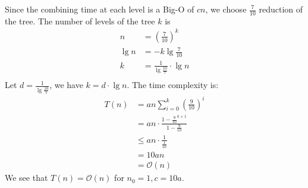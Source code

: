 \begin{parts}
\begin{customsolutionbox}
                    Since the combining time at each level is a Big-O of $cn$, we choose $\frac{7}{10}$ reduction of the tree. The number of levels of the tree $k$ is 
                    \begin{align*}
                        n &= \left(\frac{7}{10}\right)^k \\
                        \lg n &= -k \lg \frac{7}{10} \\ 
                        k &= \frac{1}{\lg \frac{10}{7}} \cdot \lg n \\
                    \end{align*}
                    Let $d = \frac{1}{\lg \frac{10}{7}}$, we have $k = d \cdot \lg n$. The time complexity is:
                    \begin{align}
                        T(n) &= an \sum_{i=0}^{k} \left(\frac{9}{10}\right)^i \\ 
                        &= an \cdot \frac{1-\frac{9}{10}^{k+1}}{1-\frac{9}{10}} \\
                        &\leq an \cdot \frac{1}{\frac{1}{10}} \\
                        &= 10an \\
                        &= \mathcal{O}(n)
                    \end{align}
                    We see that $T(n) = \mathcal{O}(n)$ for $n_0 = 1, c = 10a$.
            \end{customsolutionbox}


\end{parts}
